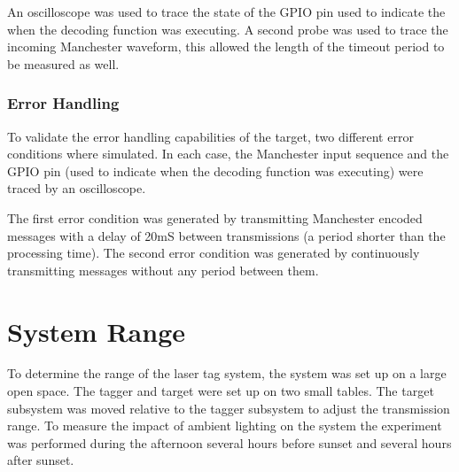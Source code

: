 An oscilloscope was used to trace the state of the GPIO pin used to indicate the when the decoding function was executing. A second probe was used to trace the incoming Manchester waveform, this allowed the length of the timeout period to be measured as well.

\subsubsection{Error Handling}
To validate the error handling capabilities of the target, two different error conditions where simulated. In each case, the Manchester input sequence and the GPIO pin (used to indicate when the decoding function was executing) were traced by an oscilloscope.

The first error condition was generated by transmitting Manchester encoded messages with a delay of 20mS between transmissions (a period shorter than the processing time). The second error condition was generated by continuously transmitting messages without any period between them.








\section{System Range}

To determine the range of the laser tag system, the system was set up on a large open space. The tagger and target were set up on two small tables. The target subsystem was moved relative to the tagger subsystem to adjust the transmission range. To measure the impact of ambient lighting on the system the experiment was performed during the afternoon several hours before sunset and several hours after sunset.

